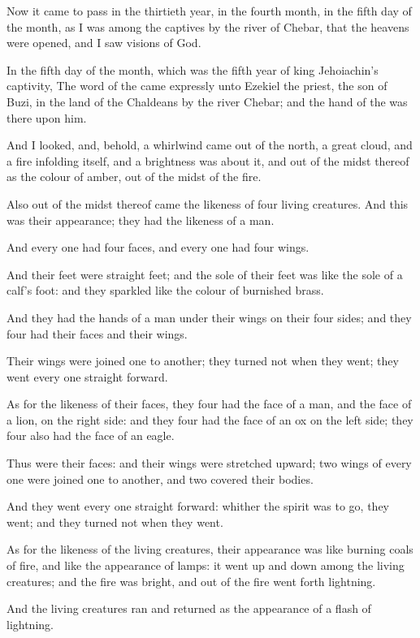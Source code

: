 \Chapter
\Verse Now it came to pass in the thirtieth year, in the fourth month, in the fifth day of the month, as I was among the captives by the river of Chebar, that the heavens were opened, and I saw visions of God.

\Verse In the fifth day of the month, which was the fifth year of king Jehoiachin's captivity, \Verse The word of the \LORD came expressly unto Ezekiel the priest, the son of Buzi, in the land of the Chaldeans by the river Chebar; and the hand of the \LORD was there upon him.

\Verse And I looked, and, behold, a whirlwind came out of the north, a great cloud, and a fire infolding itself, and a brightness was about it, and out of the midst thereof as the colour of amber, out of the midst of the fire.

\Verse Also out of the midst thereof came the likeness of four living creatures. And this was their appearance; they had the likeness of a man.

\Verse And every one had four faces, and every one had four wings.

\Verse And their feet were straight feet; and the sole of their feet was like the sole of a calf's foot: and they sparkled like the colour of burnished brass.

\Verse And they had the hands of a man under their wings on their four sides; and they four had their faces and their wings.

\Verse Their wings were joined one to another; they turned not when they went; they went every one straight forward.

\Verse As for the likeness of their faces, they four had the face of a man, and the face of a lion, on the right side: and they four had the face of an ox on the left side; they four also had the face of an eagle.

\Verse Thus were their faces: and their wings were stretched upward; two wings of every one were joined one to another, and two covered their bodies.

\Verse And they went every one straight forward: whither the spirit was to go, they went; and they turned not when they went.

\Verse As for the likeness of the living creatures, their appearance was like burning coals of fire, and like the appearance of lamps: it went up and down among the living creatures; and the fire was bright, and out of the fire went forth lightning.

\Verse And the living creatures ran and returned as the appearance of a flash of lightning.

